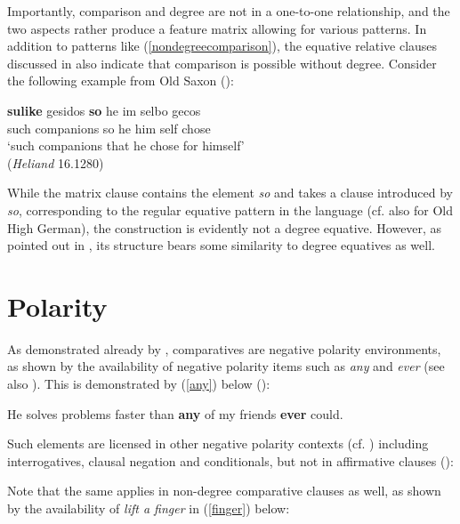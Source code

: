 Importantly, comparison and degree are not in a one-to-one relationship, and the two aspects rather produce a feature matrix allowing for various patterns. In addition to patterns like (\ref{nondegreecomparison}), the equative relative clauses discussed in  also indicate that comparison is possible without degree. Consider the following example from Old Saxon (\citealt[138]{brandnerbraeuning2013}):

\ea \gll \textbf{sulike} gesidos \textbf{so} he im selbo gecos \label{relosch5}\\
such companions so he him self chose\\
\glt `such companions that he chose for himself'\\(\textit{Heliand} 16.1280)
\z

While the matrix clause contains the element \textit{so} and takes a clause introduced by \textit{so}, corresponding to the regular equative pattern in the language (cf. also \citealt{jaeger2010} for Old High German), the construction is evidently not a degree equative. However, as pointed out in , its structure bears some similarity to degree equatives as well.

\section{Polarity} \label{sec:5polarity}
As demonstrated already by \citet{seuren1973}, comparatives are negative polarity environments, as shown by the availability of negative polarity items such as \textit{any} and \textit{ever} (see also ). This is demonstrated by (\ref{any}) below (\citealt[531, ex. 10]{seuren1973}):

\ea He solves problems faster than \textbf{any} of my friends \textbf{ever} could. \label{any}
\z

Such elements are licensed in other negative polarity contexts (cf. \citealt{klima1964}) including interrogatives, clausal negation and conditionals, but not in affirmative clauses (\citealt[531, ex. 11]{seuren1973}):

\ea
{}
\z
\z

\begin{sloppypar}
Note that the same applies in non-degree comparative clauses as well, as shown by the availability of \textit{lift a finger} in (\ref{finger}) below:
\end{sloppypar}

